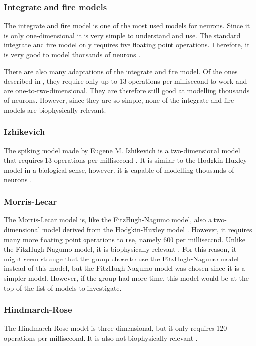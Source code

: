 \documentclass[class={myRUCProject}, crop=false]{standalone}
\begin{document}
\subsubsection*{Integrate and fire models}
The integrate and fire model is one of the most used models for neurons. Since it is only one-dimensional it is very simple to understand and use. The standard integrate and fire model only requires five floating point operations. Therefore, it is very good to model thousands of neurons \cite{Izhikevich2004}.

There are also many adaptations of the integrate and fire model. Of the ones described in \cite{Izhikevich2004}, they require only up to 13 operations per millisecond to work and are one-to-two-dimensional. They are therefore still good at modelling thousands of neurons. However, since they are so simple, none of the integrate and fire models are biophysically relevant.

\subsubsection*{Izhikevich}
The spiking model made by Eugene M. Izhikevich is a two-dimensional model that requires 13 operations per millisecond \cite{Izhikevich2004}. It is similar to the Hodgkin-Huxley model in a biological sense, however, it is capable of modelling thousands of neurons \cite{Muni2022}. 

\subsubsection*{Morris-Lecar}
The Morris-Lecar model is, like the FitzHugh-Nagumo model, also a two-dimensional model derived from the Hodgkin-Huxley model \cite{Baladron2012}. However, it requires many more floating point operations to use, namely 600 per millisecond. Unlike the FitzHugh-Nagumo model, it is biophysically relevant \cite{Izhikevich2004}. For this reason, it might seem strange that the group chose to use the FitzHugh-Nagumo model instead of this model, but the FitzHugh-Nagumo model was chosen since it is a simpler model. However, if the group had more time, this model would be at the top of the list of models to investigate. 


\subsubsection*{Hindmarch-Rose}
The Hindmarch-Rose model is three-dimensional, but it only requires 120 operations per millisecond. It is also not biophysically relevant \cite{Izhikevich2004}.
\end{document}
